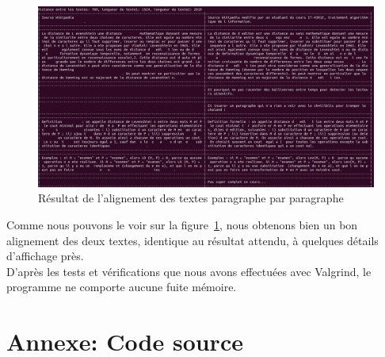 \documentclass{article}
\begin{document}
\begin{figure}[!hbt]
	\centering
	\includegraphics[width=0.95\linewidth]{./images/exo4.png}
	\caption{Résultat de l'alignement des textes paragraphe par paragraphe}%
	\label{fig:exo4}
\end{figure}

Comme nous pouvons le voir sur la figure~\ref{fig:exo4}, nous obtenons bien un
bon alignement des deux textes, identique au résultat attendu, à quelques
détails d'affichage près.\\

D'après les tests et vérifications que nous avons effectuées avec Valgrind, le
programme ne comporte aucune fuite mémoire.\\


\clearpage
\section{Annexe: Code source}
		
\end{document}
